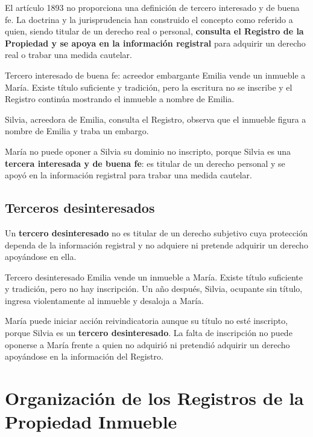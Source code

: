 \documentclass[12pt,oneside]{book}
\begin{document}
El artículo 1893 no proporciona una definición de tercero interesado y de buena fe. La doctrina y la jurisprudencia han construido el concepto como referido a quien, siendo titular de un derecho real o personal, \textbf{consulta el Registro de la Propiedad y se apoya en la información registral} para adquirir un derecho real o trabar una medida cautelar.

\begin{example}{Tercero interesado de buena fe: acreedor embargante}
Emilia vende un inmueble a María. Existe título suficiente y tradición, pero la escritura no se inscribe y el Registro continúa mostrando el inmueble a nombre de Emilia.

Silvia, acreedora de Emilia, consulta el Registro, observa que el inmueble figura a nombre de Emilia y traba un embargo.

María no puede oponer a Silvia su dominio no inscripto, porque Silvia es una \textbf{tercera interesada y de buena fe}: es titular de un derecho personal y se apoyó en la información registral para trabar una medida cautelar.
\end{example}

\section{Terceros desinteresados}

Un \textbf{tercero desinteresado} no es titular de un derecho subjetivo cuya protección dependa de la información registral y no adquiere ni pretende adquirir un derecho apoyándose en ella.

\begin{example}{Tercero desinteresado}
Emilia vende un inmueble a María. Existe título suficiente y tradición, pero no hay inscripción. Un año después, Silvia, ocupante sin título, ingresa violentamente al inmueble y desaloja a María.

María puede iniciar acción reivindicatoria aunque su título no esté inscripto, porque Silvia es un \textbf{tercero desinteresado}. La falta de inscripción no puede oponerse a María frente a quien no adquirió ni pretendió adquirir un derecho apoyándose en la información del Registro.
\end{example}

\chapter{Organización de los Registros de la Propiedad Inmueble}
\end{document}
